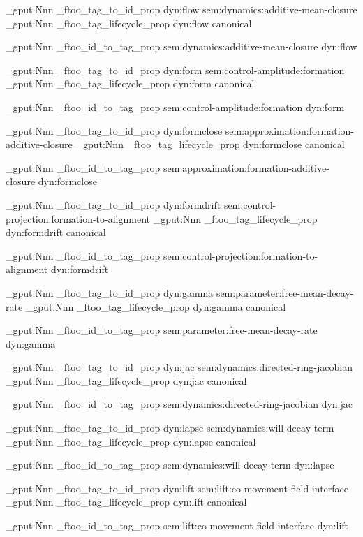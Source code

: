 \prop_gput:Nnn \g_ftoo_tag_to_id_prop { dyn:flow } { sem:dynamics:additive-mean-closure }
\prop_gput:Nnn \g_ftoo_tag_lifecycle_prop { dyn:flow } { canonical }

\prop_gput:Nnn \g_ftoo_id_to_tag_prop { sem:dynamics:additive-mean-closure } { dyn:flow }


\prop_gput:Nnn \g_ftoo_tag_to_id_prop { dyn:form } { sem:control-amplitude:formation }
\prop_gput:Nnn \g_ftoo_tag_lifecycle_prop { dyn:form } { canonical }

\prop_gput:Nnn \g_ftoo_id_to_tag_prop { sem:control-amplitude:formation } { dyn:form }


\prop_gput:Nnn \g_ftoo_tag_to_id_prop { dyn:formclose } { sem:approximation:formation-additive-closure }
\prop_gput:Nnn \g_ftoo_tag_lifecycle_prop { dyn:formclose } { canonical }

\prop_gput:Nnn \g_ftoo_id_to_tag_prop { sem:approximation:formation-additive-closure } { dyn:formclose }


\prop_gput:Nnn \g_ftoo_tag_to_id_prop { dyn:formdrift } { sem:control-projection:formation-to-alignment }
\prop_gput:Nnn \g_ftoo_tag_lifecycle_prop { dyn:formdrift } { canonical }

\prop_gput:Nnn \g_ftoo_id_to_tag_prop { sem:control-projection:formation-to-alignment } { dyn:formdrift }


\prop_gput:Nnn \g_ftoo_tag_to_id_prop { dyn:gamma } { sem:parameter:free-mean-decay-rate }
\prop_gput:Nnn \g_ftoo_tag_lifecycle_prop { dyn:gamma } { canonical }

\prop_gput:Nnn \g_ftoo_id_to_tag_prop { sem:parameter:free-mean-decay-rate } { dyn:gamma }


\prop_gput:Nnn \g_ftoo_tag_to_id_prop { dyn:jac } { sem:dynamics:directed-ring-jacobian }
\prop_gput:Nnn \g_ftoo_tag_lifecycle_prop { dyn:jac } { canonical }

\prop_gput:Nnn \g_ftoo_id_to_tag_prop { sem:dynamics:directed-ring-jacobian } { dyn:jac }


\prop_gput:Nnn \g_ftoo_tag_to_id_prop { dyn:lapse } { sem:dynamics:will-decay-term }
\prop_gput:Nnn \g_ftoo_tag_lifecycle_prop { dyn:lapse } { canonical }

\prop_gput:Nnn \g_ftoo_id_to_tag_prop { sem:dynamics:will-decay-term } { dyn:lapse }


\prop_gput:Nnn \g_ftoo_tag_to_id_prop { dyn:lift } { sem:lift:co-movement-field-interface }
\prop_gput:Nnn \g_ftoo_tag_lifecycle_prop { dyn:lift } { canonical }

\prop_gput:Nnn \g_ftoo_id_to_tag_prop { sem:lift:co-movement-field-interface } { dyn:lift }


